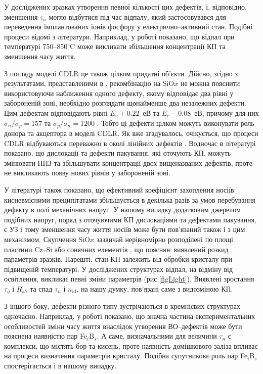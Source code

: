 У досліджених зразках утворення певної кількості цих дефектів, і, відповідно, зменшення $\tau _n$ могло відбутися під час відпалу,
який застосовувався для переведення імплантованих іонів фосфору у електрично--активний стан.
Подібні процеси відомі з літератури.
Наприклад, у роботі \cite{SiO:Miyagi} показано, що відпал при температурі 750--850$^\circ$C
може викликати збільшення концентрації КП та зменшення часу життя.

З погляду моделі CDLR це також цілком придатні об'єкти.
Дійсно, згідно з результатами, представленими в \cite{MurphySC2014,MurphyJAP2012},
рекомбінацію на SiO$x$ не можна пояснити використовуючи наближення одного дефекту, якому відповідає два рівні у забороненій зоні,
необхідно розглядати щонайменше два незалежних дефекти.
Цим дефектам відповідають рівні $E_v+0.22$~еВ та $E_c-0.08$~еВ, причому для них $\sigma_n/\sigma_p=157$ та $\sigma_p/\sigma_n=1200$ \cite{MurphyJAP2012}.
Тобто ці дефекти цілком можуть виконувати роль донора та акцептора в моделі CDLR.
Як вже згадувалось, очікується, що процеси CDLR відбуваються переважно в околі лінійних дефектів \cite{CDLR:JAP,CDLR:SSP}.
Водночас в літературі \cite{MurphySC2014,MurphyJAP2011,MurphyJAP2012} показано, що дислокації та дефекти пакування,
які оточують КП, можуть змінювати ППЗ та збільшувати концентрації двох вищеназваних дефектів,
проте не викликають появу  нових рівнів у забороненій зоні.

У літературі \cite{MurphyJAP2011} також показано, що ефективний коефіцієнт захоплення носіїв кисневмісними
преципітатами збільшується в декілька разів за умов перебування дефекту в полі механічних напруг.
У нашому випадку додатковим джерелом подібних напруг, поряд
з оточуючими КП дислокаціями та дефектами пакування, є УЗ і тому зменшення
часу життя носіїв може бути пов'язаний також і з цим механізмом.
Скупчення SiO$x$ зазвичай нерівномірно розподілені по площі пластини  Cz--Si \cite{Oxide_Schon} або сонячних елементів \cite{Oxide:Chen}, що пояснює виявлений розкид параметрів зразків.
Нарешті,  стан КП залежить від обробки кристалу при підвищеній температурі.
У досліджених структурах відпал, на відміну від освітлення, викликає певні зміни параметрів (рис.\ref{figLight}).
Виявлені зростання $\tau_g$ і $R_{sh}$ та спад $\tau_n$ і $n_\mathrm{id}$, на нашу думку, пов'язані саме з видозміною КП.

З іншого боку, дефекти різного типу зустрічаються в кремнієвих структурах одночасно.
Наприклад, у роботі \cite{BO:Fe} показано, що значна частина експериментальних особливостей зміни часу життя
внаслідок утворення ВО--дефектів може бути пояснена наявністю
пар  Fe$_i$B$_s$.
А саме, визначальними для величини $\tau_n$ є комплекси, що містять бор та кисень, проте
наявність домішкового заліза впливає на процеси визначення параметрів кристалу.
Подібна супутникова роль пар Fe$_i$B$_s$ спостерігається і в нашому випадку.

